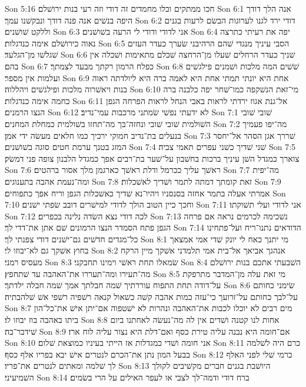 Son 5:16  חכו ממתקים וכלו מחמדים זה דודי וזה רעי בנות ירושׁלם׃
Son 6:1  אנה הלך דודך היפה בנשׁים אנה פנה דודך ונבקשׁנו עמך׃
Son 6:2  דודי ירד לגנו לערוגות הבשׂם לרעות בגנים וללקט שׁושׁנים׃
Son 6:3  אני לדודי ודודי לי הרעה בשׁושׁנים׃
Son 6:4  יפה את רעיתי כתרצה נאוה כירושׁלם אימה כנדגלות׃
Son 6:5  הסבי עיניך מנגדי שׁהם הרהיבני שׂערך כעדר העזים שׁגלשׁו מן־הגלעד׃
Son 6:6  שׁניך כעדר הרחלים שׁעלו מן־הרחצה שׁכלם מתאימות ושׁכלה אין בהם׃
Son 6:7  כפלח הרמון רקתך מבעד לצמתך׃
Son 6:8  שׁשׁים המה מלכות ושׁמנים פילגשׁים ועלמות אין מספר׃
Son 6:9  אחת היא יונתי תמתי אחת היא לאמה ברה היא ליולדתה ראוה בנות ויאשׁרוה מלכות ופילגשׁים ויהללוה׃
Son 6:10  מי־זאת הנשׁקפה כמו־שׁחר יפה כלבנה ברה כחמה אימה כנדגלות׃
Son 6:11  אל־גנת אגוז ירדתי לראות באבי הנחל לראות הפרחה הגפן הנצו הרמנים׃
Son 6:12  לא ידעתי נפשׁי שׂמתני מרכבות עמי־נדיב׃
Son 7:1  שׁובי שׁובי השׁולמית שׁובי שׁובי ונחזה־בך מה־תחזו בשׁולמית כמחלת המחנים׃
Son 7:2  מה־יפו פעמיך בנעלים בת־נדיב חמוקי ירכיך כמו חלאים מעשׂה ידי אמן׃
Son 7:3  שׁררך אגן הסהר אל־יחסר המזג בטנך ערמת חטים סוגה בשׁושׁנים׃
Son 7:4  שׁני שׁדיך כשׁני עפרים תאמי צביה׃
Son 7:5  צוארך כמגדל השׁן עיניך ברכות בחשׁבון על־שׁער בת־רבים אפך כמגדל הלבנון צופה פני דמשׂק׃
Son 7:6  ראשׁך עליך ככרמל ודלת ראשׁך כארגמן מלך אסור ברהטים׃
Son 7:7  מה־יפית ומה־נעמת אהבה בתענוגים׃
Son 7:8  זאת קומתך דמתה לתמר ושׁדיך לאשׁכלות׃
Son 7:9  אמרתי אעלה בתמר אחזה בסנסניו ויהיו־נא שׁדיך כאשׁכלות הגפן וריח אפך כתפוחים׃
Son 7:10  וחכך כיין הטוב הולך לדודי למישׁרים דובב שׂפתי ישׁנים׃
Son 7:11  אני לדודי ועלי תשׁוקתו׃
Son 7:12  לכה דודי נצא השׂדה נלינה בכפרים׃
Son 7:13  נשׁכימה לכרמים נראה אם פרחה הגפן פתח הסמדר הנצו הרמונים שׁם אתן את־דדי לך׃
Son 7:14  הדודאים נתנו־ריח ועל־פתחינו כל־מגדים חדשׁים גם־ישׁנים דודי צפנתי לך׃
Son 8:1  מי יתנך כאח לי יונק שׁדי אמי אמצאך בחוץ אשׁקך גם לא־יבוזו לי׃
Son 8:2  אנהגך אביאך אל־בית אמי תלמדני אשׁקך מיין הרקח מעסיס רמני׃
Son 8:3  שׂמאלו תחת ראשׁי וימינו תחבקני׃
Son 8:4  השׁבעתי אתכם בנות ירושׁלם מה־תעירו ומה־תעררו את־האהבה עד שׁתחפץ׃
Son 8:5  מי זאת עלה מן־המדבר מתרפקת על־דודה תחת התפוח עוררתיך שׁמה חבלתך אמך שׁמה חבלה ילדתך׃
Son 8:6  שׂימני כחותם על־לבך כחותם על־זרועך כי־עזה כמות אהבה קשׁה כשׁאול קנאה רשׁפיה רשׁפי אשׁ שׁלהבתיה׃
Son 8:7  מים רבים לא יוכלו לכבות את־האהבה ונהרות לא ישׁטפוה אם־יתן אישׁ את־כל־הון ביתו באהבה בוז יבוזו לו׃
Son 8:8  אחות לנו קטנה ושׁדים אין לה מה־נעשׂה לאחתנו ביום שׁידבר־בה׃
Son 8:9  אם־חומה היא נבנה עליה טירת כסף ואם־דלת היא נצור עליה לוח ארז׃
Son 8:10  אני חומה ושׁדי כמגדלות אז הייתי בעיניו כמוצאת שׁלום׃
Son 8:11  כרם היה לשׁלמה בבעל המון נתן את־הכרם לנטרים אישׁ יבא בפריו אלף כסף׃
Son 8:12  כרמי שׁלי לפני האלף לך שׁלמה ומאתים לנטרים את־פריו׃
Son 8:13  היושׁבת בגנים חברים מקשׁיבים לקולך השׁמיעיני׃
Son 8:14  ברח דודי ודמה־לך לצבי או לעפר האילים על הרי בשׂמים׃



